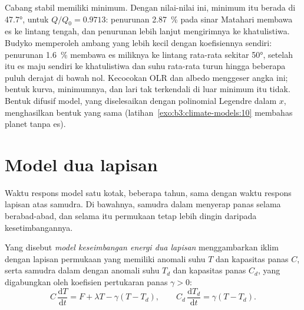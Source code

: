 \begin{omfigure}
\par{}\label{fig:b3:climate-models:budyko}
\end{omfigure}

Cabang stabil memiliki minimum. Dengan nilai-nilai ini, minimum itu berada di \ang{47.7},
untuk $Q/Q_0 = \num{0.9713}$: penurunan \qty{2.87}{\percent} pada sinar Matahari
membawa es ke lintang tengah, dan penurunan lebih lanjut mengirimnya ke
khatulistiwa. Budyko memperoleh ambang yang lebih kecil dengan koefisiennya sendiri:
penurunan \qty{1.6}{\percent} membawa es miliknya ke lintang rata-rata sekitar
\ang{50}, setelah itu es maju sendiri ke khatulistiwa dan
suhu rata-rata turun hingga beberapa puluh derajat di bawah nol. Kecocokan OLR dan
albedo menggeser angka ini; bentuk kurva, minimumnya, dan
lari tak terkendali di luar minimum itu tidak. Bentuk difusif model, yang diselesaikan dengan
polinomial Legendre dalam $x$, menghasilkan bentuk yang sama (latihan~\ref{exo:b3:climate-models:10}
membahas planet tanpa es).

\section{Model dua lapisan}\label{sec:b3:climate-models:two-layer}

Waktu respons model satu kotak, beberapa tahun, sama dengan waktu respons lapisan atas
samudra. Di bawahnya, samudra dalam menyerap panas selama berabad-abad, dan selama itu
permukaan tetap lebih dingin daripada kesetimbangannya.

\begin{definition}\label{def:b3:climate-models:two-layer}
Yang disebut \emph{model keseimbangan energi dua lapisan}
menggambarkan iklim dengan lapisan permukaan yang memiliki anomali suhu $T$
dan kapasitas panas $C$, serta samudra dalam dengan anomali suhu $T_d$ dan
kapasitas panas $C_d$, yang digabungkan oleh koefisien pertukaran panas $\gamma > 0$:
\[
C\,\frac{\mathrm dT}{\mathrm dt} = F + \lambda T - \gamma(T - T_d), \qquad
C_d\,\frac{\mathrm dT_d}{\mathrm dt} = \gamma(T - T_d) .
\]
\end{definition}

